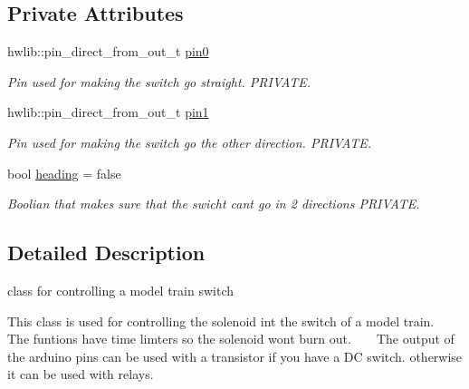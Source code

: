 \subsection*{Private Attributes}
\begin{DoxyCompactItemize}
\item 
\mbox{\label{classrail__switch_aa2a6e401f815d2f45f1281e898b9de9a}} 
hwlib\+::pin\+\_\+direct\+\_\+from\+\_\+out\+\_\+t \hyperlink{classrail__switch_aa2a6e401f815d2f45f1281e898b9de9a}{pin0}
\begin{DoxyCompactList}\small\item\em Pin used for making the switch go straight. P\+R\+I\+V\+A\+TE. \end{DoxyCompactList}\item 
\mbox{\label{classrail__switch_a0d5ab573e3393fc32572b1f5edcaf8d9}} 
hwlib\+::pin\+\_\+direct\+\_\+from\+\_\+out\+\_\+t \hyperlink{classrail__switch_a0d5ab573e3393fc32572b1f5edcaf8d9}{pin1}
\begin{DoxyCompactList}\small\item\em Pin used for making the switch go the other direction. P\+R\+I\+V\+A\+TE. \end{DoxyCompactList}\item 
\mbox{\label{classrail__switch_a2cdc7336f85678809cb0b5a1485c7c86}} 
bool \hyperlink{classrail__switch_a2cdc7336f85678809cb0b5a1485c7c86}{heading} = false
\begin{DoxyCompactList}\small\item\em Boolian that makes sure that the swicht can\textquotesingle{}t go in 2 directions P\+R\+I\+V\+A\+TE. \end{DoxyCompactList}\end{DoxyCompactItemize}


\subsection{Detailed Description}
class for controlling a model train switch 

This class is used for controlling the solenoid int the switch of a model train. ~\newline
 The funtions have time limters so the solenoid wont burn out. ~\newline
 ~\newline
 The output of the arduino pins can be used with a transistor if you have a DC switch. otherwise it can be used with relays. 

